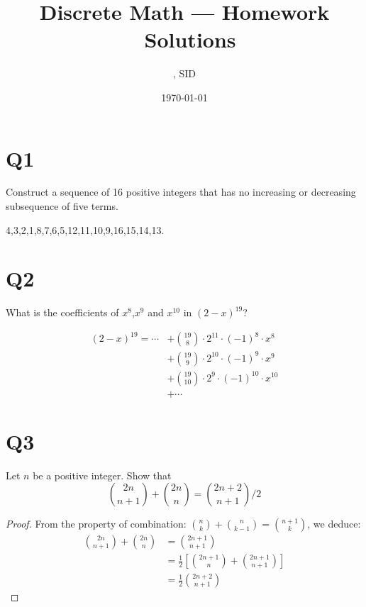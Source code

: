 \documentclass[11pt]{article}
\title{Discrete Math --- Homework \Homework \ Solutions}
\author{\Name, SID \SID}
\date{\today}
\begin{document}
\maketitle

\section*{Q1}
Construct a sequence of 16 positive integers that has no
increasing or decreasing subsequence of ﬁve terms.
\begin{solution}
    4,3,2,1,8,7,6,5,12,11,10,9,16,15,14,13.
\end{solution}

\section*{Q2}
What is the coeﬃcients of $x^{8}$,$x^{9}$ and $x^{10}$ in $(2-x)^{19}$?
\begin{solution}

\begin{align*}
(2-x)^{19} = \cdots 
    &+ \binom{19}{8} \cdot 2^{11}\cdot (-1)^{8} \cdot  x^{8}\\
    &+ \binom{19}{9}\cdot 2^{10} \cdot (-1)^{9}\cdot x^{9}\\
    &+ \binom{19}{10}\cdot 2^{9}\cdot (-1)^{10}\cdot x^{10}\\
    &+ \cdots 
\end{align*}
\end{solution}

\section*{Q3}
Let $n$ be a positive integer. Show that
$$
\binom{2n }{n+1 }+\binom{2n }{n}=\binom{2n+2 }{n+1 } / 2
$$
\begin{proof}
From the property of combination: 
$\binom{n }{k}+\binom{n }{k-1}=\binom{n+1 }{k}$, we deduce:
\begin{align*}
  \binom{2n }{n+1}+\binom{2n }{n}&=\binom{2n+1 }{n+1}\\
  &=\frac{1}{2}\left[\binom{2n+1 }{n}+\binom{2n+1}{n+1}\right]\\
  &=\frac{1}{2 }\binom{2n+2}{n+1}
\end{align*}
\end{proof}
\end{document}
